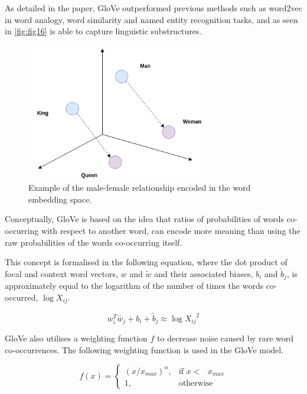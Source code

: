 \noindent 
\newline
\newline
As detailed in the paper, GloVe outperformed previous methods such as word2vec in word analogy, word similarity and named entity recognition tasks, and as seen in \autoref{fig:fig16} is able to capture linguistic substructures.

\begin{figure}[h]
	\includegraphics[width=8cm, height=6cm]{./figures/fig16}
	\centering
	\caption[Word Embedding Visualisation]{Example of the male-female relationship encoded in the word embedding space.}
	\label{fig:fig16}
\end{figure}

\noindent
Conceptually, GloVe is based on the idea that ratios of probabilities of words co-occurring with respect to another word, can encode more meaning than using the raw probabilities of the words co-occurring itself.

\noindent
\newline
This concept is formalised in the following equation, where the dot product of focal and context word vectors, \(w\) and \(\tilde{w}\) and their associated biases, \(b_{i} \) and \(\tilde{b}_{j}\), is approximately equal to the logarithm of the number of times the words co-occurred, \(\log{X_{ij}}\).

\begin{equation}
w_{i}^{T} \tilde{w_{j}} + b_{i} + \tilde{b}_{j} \approx \log{X_{ij}}^{2}
\end{equation}

\noindent
\newline
GloVe also utilises a weighting function \(f\) to decrease noise caused by rare word co-occurrences. The following weighting function is used in the GloVe model.

\begin{equation}
	f(x) =
	\begin{cases}
	(x/x_{max})^{\alpha}, & \text{if  \(x <\) } x_{max} \\
	1, & \text{otherwise}
	\end{cases}
\end{equation}

